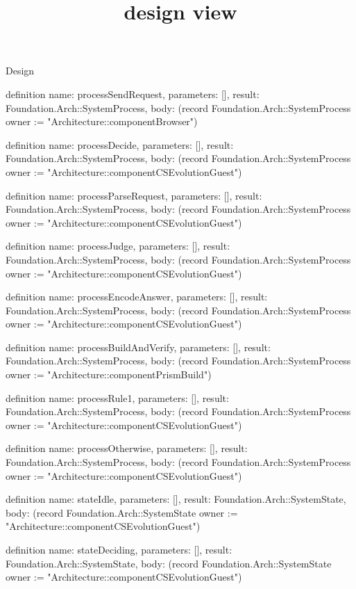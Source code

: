 \begin{lexlean}{Design}
\title{design view}
\begin{semanticmodule}
definition{
  name: processSendRequest,
  parameters: [],
  result: Foundation.Arch::SystemProcess,
  body: (record Foundation.Arch::SystemProcess {owner := "Architecture::componentBrowser"})
}

definition{
  name: processDecide,
  parameters: [],
  result: Foundation.Arch::SystemProcess,
  body: (record Foundation.Arch::SystemProcess {owner := "Architecture::componentCSEvolutionGuest"})
}

definition{
  name: processParseRequest,
  parameters: [],
  result: Foundation.Arch::SystemProcess,
  body: (record Foundation.Arch::SystemProcess {owner := "Architecture::componentCSEvolutionGuest"})
}

definition{
  name: processJudge,
  parameters: [],
  result: Foundation.Arch::SystemProcess,
  body: (record Foundation.Arch::SystemProcess {owner := "Architecture::componentCSEvolutionGuest"})
}

definition{
  name: processEncodeAnswer,
  parameters: [],
  result: Foundation.Arch::SystemProcess,
  body: (record Foundation.Arch::SystemProcess {owner := "Architecture::componentCSEvolutionGuest"})
}

definition{
  name: processBuildAndVerify,
  parameters: [],
  result: Foundation.Arch::SystemProcess,
  body: (record Foundation.Arch::SystemProcess {owner := "Architecture::componentPrismBuild"})
}

definition{
  name: processRule1,
  parameters: [],
  result: Foundation.Arch::SystemProcess,
  body: (record Foundation.Arch::SystemProcess {owner := "Architecture::componentCSEvolutionGuest"})
}

definition{
  name: processOtherwise,
  parameters: [],
  result: Foundation.Arch::SystemProcess,
  body: (record Foundation.Arch::SystemProcess {owner := "Architecture::componentCSEvolutionGuest"})
}

definition{
  name: stateIdle,
  parameters: [],
  result: Foundation.Arch::SystemState,
  body: (record Foundation.Arch::SystemState {owner := "Architecture::componentCSEvolutionGuest"})
}

definition{
  name: stateDeciding,
  parameters: [],
  result: Foundation.Arch::SystemState,
  body: (record Foundation.Arch::SystemState {owner := "Architecture::componentCSEvolutionGuest"})
}


\end{semanticmodule}
\end{lexlean}
